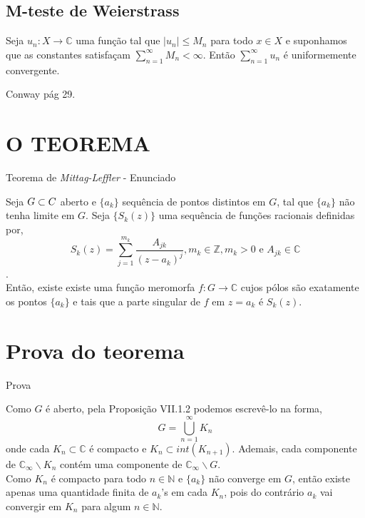 \documentclass{libs/ufc_format}
\begin{document}
\subsection{M-teste de Weierstrass}
\begin{frame}
   \begin{teo}
       Seja $u_{n}:X\rightarrow \mathbb{C}$ uma função tal que $\left|u_{n}\right|\leq M_{n}$ para todo $x\in X$ \pause e suponhamos que as constantes satisfaçam $\displaystyle \sum_{n=1}^{\infty}M_{n}< \infty$. \pause Então $\displaystyle \sum_{n=1}^{\infty}u_{n}$ é uniformemente convergente. 
\end{teo}
\begin{prova}
 Conway pág 29.
\end{prova} 
\end{frame}

\section{O TEOREMA}
\begin{frame}{Teorema de \textit{Mittag-Leffler} - Enunciado}
   \begin{teo}
Seja $G\subset \mathbb\mathbb{C}$ aberto e $\{a_{k}\}$ sequência de pontos distintos em $G$, tal que $\{a_{k}\}$ não tenha limite em $G$. \pause Seja $\{S_{k}\left(z\right)\}$ uma sequência de funções racionais definidas por, \pause
$$S_{k}\left(z\right)= \displaystyle \sum_{j=1}^{m_{k}}\frac{A_{jk}}{\left(z-a_{k}\right)^{j}}, m_{k}\in \mathbb{Z}, m_{k}>0 \text{ e } A_{jk}\in \mathbb{C}$$.\\
 \pause Então, existe existe uma função meromorfa $f:G\rightarrow \mathbb{C}$ cujos pólos são exatamente os pontos $\{a_{k}\}$ e tais que a parte singular de $f$ em $z=a_{k}$ é $S_{k}\left(z\right)$.
\end{teo} 
\end{frame}

\section{Prova do teorema}
\begin{frame}{Prova}
\begin{prova}
Como $G$ é aberto, pela Proposição VII.1.2 podemos escrevê-lo na forma, \pause
$$G=\bigcup_{n=1}^{\infty}K_{n}$$
onde cada $K_{n}\subset \mathbb{C}$ é compacto e $K_{n}\subset int\left(K_{n+1}\right)$. Ademais, cada componente de $\mathbb{C}_{\infty}\backslash K_{n}$ contém uma componente de  $\mathbb{C}_{\infty}\backslash G$.\\ \pause
Como $K_{n}$ é compacto para todo $n \in \mathbb{N}$ e $\{a_{k}\}$ não converge em $G$, então existe apenas uma quantidade finita de $a_{k}$'s em cada $K_{n}$, pois do contrário $a_{k}$ vai convergir em $K_{n}$ para algum $n\in \mathbb{N}$.
\end{prova}
\end{frame}
\end{document}
